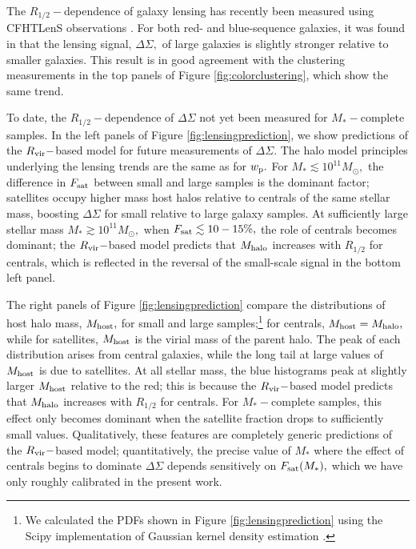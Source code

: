 \documentclass[usenatbib,usegraphicx,letterpaper]{mn2e}
\newcommand{\rhalf}{R_{1/2}}
\newcommand{\mstar}{M_{\ast}}
\newcommand{\mhalo}{M_{\rm halo}}
\newcommand{\mhost}{M_{\rm host}}
\newcommand{\rvir}{R_{\rm vir}}
\newcommand{\wproj}{w_{\rm p}}
\newcommand{\msun}{M_\odot}
\begin{document}
The $\rhalf-$dependence of galaxy lensing has recently been measured using CFHTLenS observations \citep{heymans_etal12,erben_etal13}. For both red- and blue-sequence galaxies, it was found in \citet{charlton_etal17} that the lensing signal, $\Delta\Sigma,$ of large galaxies is slightly stronger relative to smaller galaxies. This result is in good agreement with the clustering measurements in the top panels of Figure \ref{fig:colorclustering}, which show the same trend. 

To date, the $\rhalf-$dependence of $\Delta\Sigma$ not yet been measured for $\mstar-$complete samples. In the left panels of Figure \ref{fig:lensingprediction}, we show predictions of the $\rvir-$based model for future measurements of $\Delta\Sigma.$ The halo model principles underlying the lensing trends are the same as for $\wproj.$ For $\mstar\lesssim10^{11}\msun,$ the difference in $F_{\rm sat}$ between small and large samples is the dominant factor; satellites occupy higher mass host halos relative to centrals of the same stellar mass, boosting $\Delta\Sigma$ for small relative to large galaxy samples. At sufficiently large stellar mass $\mstar\gtrsim10^{11}\msun,$ when $F_{\rm sat}\lesssim10-15\%,$ the role of centrals becomes dominant; the $\rvir-$based model predicts that $\mhalo$ increases with $\rhalf$ for centrals, which is reflected in the reversal of the small-scale signal in the bottom left panel. 

The right panels of Figure \ref{fig:lensingprediction} compare the distributions of host halo mass, $\mhost,$ for small and large samples;\footnote{We calculated the PDFs shown in Figure \ref{fig:lensingprediction} using the Scipy implementation of Gaussian kernel density estimation \citep{scipy}.} for centrals, $\mhost=\mhalo,$ while for satellites, $\mhost$ is the virial mass of the parent halo. The peak of each distribution arises from central galaxies, while the long tail at large values of $\mhost$ is due to satellites. At all stellar mass, the blue histograms peak at slightly larger $\mhost$ relative to the red; this is because the $\rvir-$based model predicts that $\mhalo$ increases with $\rhalf$ for centrals. For $\mstar-$complete samples, this effect only becomes dominant when the satellite fraction drops to sufficiently small values. Qualitatively, these features are completely generic predictions of the $\rvir-$based model; quantitatively, the precise value of $\mstar$ where the effect of centrals begins to dominate $\Delta\Sigma$ depends sensitively on $F_{\rm sat}(\mstar),$ which we have only roughly calibrated in the present work. 
\end{document}

